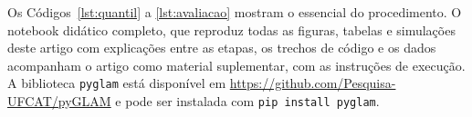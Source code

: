 Os Códigos~\ref{lst:quantil} a \ref{lst:avaliacao} mostram o essencial do procedimento. O notebook didático completo, que reproduz todas as figuras, tabelas e simulações deste artigo com explicações entre as etapas, os trechos de código e os dados acompanham o artigo como material suplementar, com as instruções de execução. A biblioteca \texttt{pyglam} está disponível em \url{https://github.com/Pesquisa-UFCAT/pyGLAM} e pode ser instalada com \texttt{pip install pyglam}.
